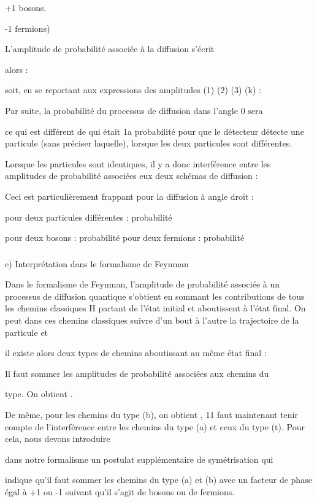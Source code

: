 +1 bosons.

-1 fermions)


L'amplitude de probabilité associée à la diffusion s'écrit

alors :

soit, en se reportant aux expressions des amplitudes (1) (2) (3) (k) :

Par suite, la probabilité du processus de diffusion dans l'angle 0 sera

ce qui est différent de  qui était 1a probabilité pour que le détecteur détecte
une particule (sans préciser laquelle),
lorsque les deux particules sont différentes.

Lorsque les particules sont identiques, il y a donc interférence entre les
amplitudes de probabilité associées eux deux schémas
de diffusion :


Ceci est particulièrement frappant pour la diffusion à angle
droit  :

pour deux particules différentes : probabilité

pour deux bosons : probabilité
pour deux fermions : probabilité

\subsubsection{}%
c) Interprétation dans le formalisme de Feynman

Dans le formalisme de Feynman, l'amplitude de probabilité
associée à un processus de diffusion quantique s'obtient en sommant
les contributions de tous les chemins classiques H partant de l'état
initial et aboutissent à l'état final. On peut dans ces chemins classiques
suivre d'un bout à l'autre la trajectoire de la particule et

il existe alors deux types de chemins aboutissant au même état final :

Il faut sommer les amplitudes de probabilité associées aux chemins du

type.  On obtient .


De même, pour les chemins du type (b), on obtient ,
11 faut maintenant tenir compte de l'interférence entre les chemins
du type (a) et ceux du type (t). Pour cela, nous devons introduire

dans notre formalisme un postulat supplémentaire de symétrisation qui

indique qu'il faut sommer les chemins du type (a) et (b) avec un facteur de
phase égal à +1 ou -1 suivant qu'il s'agit de bosons ou de
fermions.

